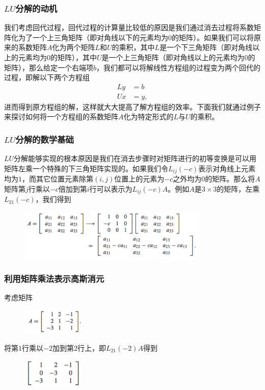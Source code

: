 \documentclass[10pt]{beamer}
\begin{document}
\begin{frame}
\frametitle{$LU$分解的动机}
我们考虑回代过程，回代过程的计算量比较低的原因是我们通过消去过程将系数矩阵化为了一个上三角矩阵（即对角线以下的元素均为$0$的矩阵）。如果我们可以将原来的系数矩阵$A$化为两个矩阵$L$和$U$的乘积，其中$L$是一个下三角矩阵（即对角线以上的元素均为$0$的矩阵），其中$U$是一个上三角矩阵（即对角线以上的元素均为$0$的矩阵），那么给定一个右端项$b$，我们都可以将解线性方程组的过程变为两个回代的过程，即解以下两个方程组
\begin{align}
Ly & = b \\
Ux & = y,
\end{align}
进而得到原方程组的解，这样就大大提高了解方程组的效率。下面我们就通过例子来探讨如何将一个方程组的系数矩阵$A$化为特定形式的$L$与$U$的乘积。

\end{frame}


\begin{frame}
\frametitle{$LU$分解的数学基础}
$LU$分解能够实现的根本原因是我们在消去步骤时对矩阵进行的初等变换是可以用矩阵左乘一个特殊的下三角矩阵实现的。如果我们令$L_{ij}(-c)$表示对角线上元素均为$1$，而其它位置元素除第$(i,j)$位置上的元素为$-c$之外均为$0$的矩阵。那么将$A$矩阵第$j$行乘以$-c$倍加到第$i$行可以表示为$L_{ij}(-c)A$。例如$A$是$3\times3$的矩阵，左乘$L_{21}(-c)$，我们得到
\begin{figure}
\includegraphics[width=9cm]{figs/2_2_LU-1} 
\end{figure}
\end{frame}


\begin{frame}
\frametitle{利用矩阵乘法表示高斯消元}
考虑矩阵
\begin{figure}
\includegraphics[width=3cm]{figs/2_2_LU-2} 
\end{figure}
将第$1$行乘以$-2$加到第$2$行上，即$L_{21}(-2) A$得到
\begin{figure}
\includegraphics[width=3cm]{figs/2_2_LU-3} 
\end{figure}
\end{frame}
\end{document}
